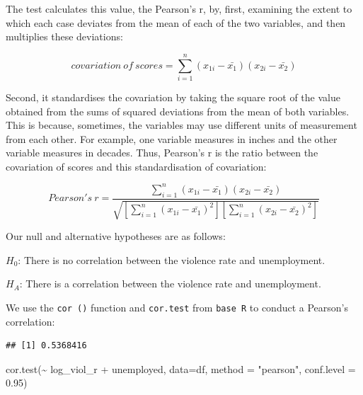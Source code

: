 \documentclass[
]{book}
\newenvironment{Shaded}{\begin{snugshade}}{\end{snugshade}}
\newcommand{\AttributeTok}[1]{\textcolor[rgb]{0.77,0.63,0.00}{#1}}
\newcommand{\FloatTok}[1]{\textcolor[rgb]{0.00,0.00,0.81}{#1}}
\newcommand{\FunctionTok}[1]{\textcolor[rgb]{0.00,0.00,0.00}{#1}}
\newcommand{\NormalTok}[1]{#1}
\newcommand{\SpecialCharTok}[1]{\textcolor[rgb]{0.00,0.00,0.00}{#1}}
\newcommand{\StringTok}[1]{\textcolor[rgb]{0.31,0.60,0.02}{#1}}
\begin{document}
The test calculates this value, the Pearson's r, by, first, examining the extent to which each case deviates from the mean of each of the two variables, and then multiplies these deviations:

\[covariation~ of ~scores = \sum_{i=1}^{n} (x_{1i} - \bar{x_1})(x_{2i} - \bar{x_2})\]

Second, it standardises the covariation by taking the square root of the value obtained from the sums of squared deviations from the mean of both variables. This is because, sometimes, the variables may use different units of measurement from each other. For example, one variable measures in inches and the other variable measures in decades. Thus, Pearson's r is the ratio between the covariation of scores and this standardisation of covariation:

\[ Pearson's~ r = \frac{\sum_{i=1}^{n} (x_{1i} - \bar{x_1})(x_{2i} - \bar{x_2})}{\sqrt{[\sum_{i=1}^{n} (x_{1i}- \bar{x_1})^2][\sum_{i=1}^{n} (x_{2i}- \bar{x_2})^2]}} \]

Our null and alternative hypotheses are as follows:

\(H_0\): There is no correlation between the violence rate and unemployment.

\(H_A\): There is a correlation between the violence rate and unemployment.

We use the \texttt{cor\ ()} function and \texttt{cor.test} from \texttt{base\ R} to conduct a Pearson's correlation:

\begin{Shaded}
\end{Shaded}

\begin{verbatim}
## [1] 0.5368416
\end{verbatim}

\begin{Shaded}
\begin{Highlighting}[]
\FunctionTok{cor.test}\NormalTok{(}\SpecialCharTok{\textasciitilde{}}\NormalTok{ log\_viol\_r }\SpecialCharTok{+}\NormalTok{ unemployed, }\AttributeTok{data=}\NormalTok{df, }\AttributeTok{method =} \StringTok{"pearson"}\NormalTok{, }\AttributeTok{conf.level =} \FloatTok{0.95}\NormalTok{)}
\end{Highlighting}
\end{Shaded}
\end{document}
